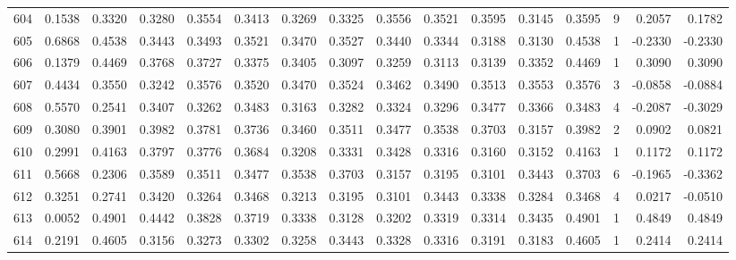 \begin{tabular}{lrrrrrrrrrrrrrrr}
604 &      0.1538 &  0.3320 &  0.3280 &  0.3554 &  0.3413 &  0.3269 &  0.3325 &  0.3556 &  0.3521 &  0.3595 &   0.3145 &     0.3595 &      9 &                    0.2057 &                     0.1782 \\
605 &      0.6868 &  0.4538 &  0.3443 &  0.3493 &  0.3521 &  0.3470 &  0.3527 &  0.3440 &  0.3344 &  0.3188 &   0.3130 &     0.4538 &      1 &                   -0.2330 &                    -0.2330 \\
606 &      0.1379 &  0.4469 &  0.3768 &  0.3727 &  0.3375 &  0.3405 &  0.3097 &  0.3259 &  0.3113 &  0.3139 &   0.3352 &     0.4469 &      1 &                    0.3090 &                     0.3090 \\
607 &      0.4434 &  0.3550 &  0.3242 &  0.3576 &  0.3520 &  0.3470 &  0.3524 &  0.3462 &  0.3490 &  0.3513 &   0.3553 &     0.3576 &      3 &                   -0.0858 &                    -0.0884 \\
608 &      0.5570 &  0.2541 &  0.3407 &  0.3262 &  0.3483 &  0.3163 &  0.3282 &  0.3324 &  0.3296 &  0.3477 &   0.3366 &     0.3483 &      4 &                   -0.2087 &                    -0.3029 \\
609 &      0.3080 &  0.3901 &  0.3982 &  0.3781 &  0.3736 &  0.3460 &  0.3511 &  0.3477 &  0.3538 &  0.3703 &   0.3157 &     0.3982 &      2 &                    0.0902 &                     0.0821 \\
610 &      0.2991 &  0.4163 &  0.3797 &  0.3776 &  0.3684 &  0.3208 &  0.3331 &  0.3428 &  0.3316 &  0.3160 &   0.3152 &     0.4163 &      1 &                    0.1172 &                     0.1172 \\
611 &      0.5668 &  0.2306 &  0.3589 &  0.3511 &  0.3477 &  0.3538 &  0.3703 &  0.3157 &  0.3195 &  0.3101 &   0.3443 &     0.3703 &      6 &                   -0.1965 &                    -0.3362 \\
612 &      0.3251 &  0.2741 &  0.3420 &  0.3264 &  0.3468 &  0.3213 &  0.3195 &  0.3101 &  0.3443 &  0.3338 &   0.3284 &     0.3468 &      4 &                    0.0217 &                    -0.0510 \\
613 &      0.0052 &  0.4901 &  0.4442 &  0.3828 &  0.3719 &  0.3338 &  0.3128 &  0.3202 &  0.3319 &  0.3314 &   0.3435 &     0.4901 &      1 &                    0.4849 &                     0.4849 \\
614 &      0.2191 &  0.4605 &  0.3156 &  0.3273 &  0.3302 &  0.3258 &  0.3443 &  0.3328 &  0.3316 &  0.3191 &   0.3183 &     0.4605 &      1 &                    0.2414 &                     0.2414 \\

\end{tabular}
